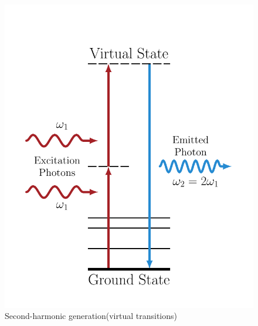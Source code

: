 \documentclass{beamer}
\begin{document}
\begin{frame}
\begin{columns}
\begin{figure}
\includegraphics[width=\textwidth]{diag-levelsshg}
\caption{\centering Second-harmonic generation\qquad(virtual transitions)}
\end{figure}
\end{columns}
\end{frame}
\end{document}
